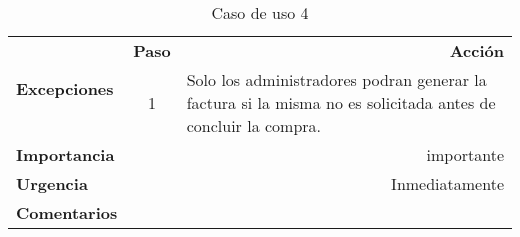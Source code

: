 \documentclass[conference]{IEEEtran}
\begin{document}
\begin{table}[H]
\begin{adjustbox}{width=0.47\textwidth}
\begin{tabular}{|p{11.215em}|r|r|}
    \midrule
    \multirow{3}[4]{*}{\textbf{Excepciones}} & \multicolumn{1}{p{5.355em}|}{\textbf{Paso}} & \multicolumn{1}{p{32em}|}{\textbf{Acción}} \\
\cmidrule{2-3}    \multicolumn{1}{|c|}{} & \multicolumn{1}{c|}{\multirow{2}[2]{*}{1}} & \multicolumn{1}{l|}{\multirow{2}[2]{*}{Solo los administradores podran generar la factura si la misma no es solicitada antes de concluir la compra.}} \\
    \multicolumn{1}{|c|}{} & \multicolumn{1}{c|}{} &  \\
    \midrule
    \textbf{Importancia} & \multicolumn{2}{p{37.355em}|}{importante } \\
    \midrule
    \textbf{Urgencia} & \multicolumn{2}{p{37.355em}|}{Inmediatamente} \\
    \midrule
    \textbf{Comentarios} & \multicolumn{2}{r|}{} \\
    \bottomrule
    \end{tabular}%
    \end{adjustbox}
    \vspace{0.3cm}
    \caption{Caso de uso 4}
  \label{tab:addlabel}%
\end{table}%
\end{document}

